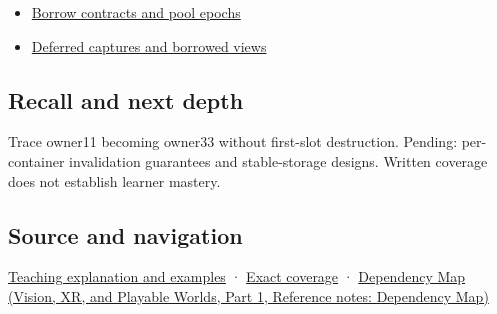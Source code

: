 \hypertarget{appendix-f9b8b9188c7f-used-by}{}

\begin{itemize}
\tightlist
\item
  \hyperref[appendix-aa405b7c3903]{Borrow contracts and pool epochs}
\item
  \hyperref[appendix-aea529eb5175]{Deferred captures and borrowed views}
\end{itemize}

\subsection{Recall and next depth}\label{appendix-f9b8b9188c7f-recall-and-next-depth}

\hypertarget{appendix-f9b8b9188c7f-recall-and-next-depth}{}

Trace owner11 becoming owner33 without first-slot destruction. Pending: per-container invalidation guarantees and stable-storage designs. Written coverage does not establish learner mastery.

\subsection{Source and navigation}\label{appendix-f9b8b9188c7f-source-and-navigation}

\hypertarget{appendix-f9b8b9188c7f-source-and-navigation}{}

\hyperref[01-foundations-i-ch003-when-a-valid-borrow-stops-naming-the-intended-thing]{Teaching explanation and examples} · \hyperref[appendix-fd090d982a15-m008---parts-113-126]{Exact coverage} · \href{../07-Vision-XR-and-Playable-Worlds-P01/main.pdf\#nameddest=appendix-4ad47bdd269a}{Dependency Map (Vision, XR, and Playable Worlds, Part 1, Reference notes: Dependency Map)}
